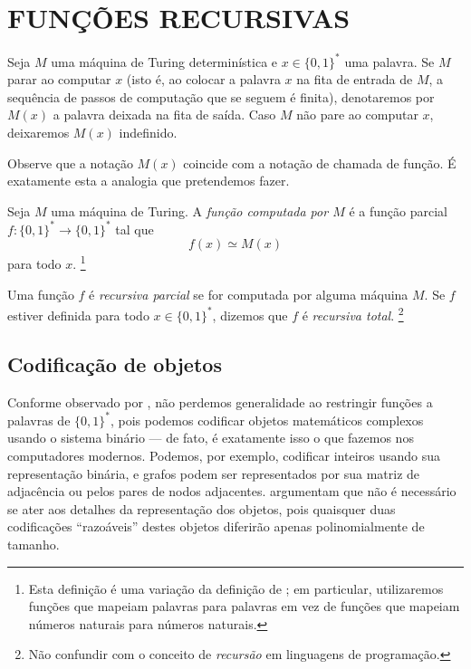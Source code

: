\section{FUNÇÕES RECURSIVAS}
\label{sec:recursive_functions}

\begin{notation}
    Seja $M$ uma máquina de Turing determinística
    e $x \in \{0, 1\}^*$ uma palavra.
    Se $M$ parar ao computar $x$
    (isto é,
    ao colocar a palavra $x$ na fita de entrada de $M$,
    a sequência de passos de computação que se seguem é finita),
    denotaremos por $M(x)$ a palavra deixada na fita de saída.
    Caso $M$ não pare ao computar $x$,
    deixaremos $M(x)$ indefinido.
\end{notation}

Observe que a notação $M(x)$ coincide com a notação de chamada de função.
É exatamente esta a analogia que pretendemos fazer.

\begin{definition}
    \label{def:recursive_function}
    Seja $M$ uma máquina de Turing.
    A \emph{função computada por $M$}
    é a função parcial $f: \{0, 1\}^* \to \{0, 1\}^*$ tal que
    \begin{equation*}
        f(x) \simeq M(x)
    \end{equation*}
    para todo $x$.%
    \footnote{
        Esta definição é uma variação da definição de
        ;
        em particular, utilizaremos funções que mapeiam palavras para palavras
        em vez de funções que mapeiam números naturais para números naturais.
    }

    Uma função $f$ é \emph{recursiva parcial}
    se for computada por alguma máquina $M$.
    Se $f$ estiver definida para todo $x \in \{0, 1\}^*$,
    dizemos que $f$ é \emph{recursiva total}.
    \footnote{
        Não confundir com o conceito de \emph{recursão} em linguagens de programação.
    }
\end{definition}

\subsection{Codificação de objetos}
\label{sec:binary_encoding}

Conforme observado por ,
não perdemos generalidade ao restringir funções a palavras de $\{0, 1\}^*$,
pois podemos codificar objetos matemáticos complexos usando o sistema binário
--- de fato,
é exatamente isso o que fazemos nos computadores modernos.
Podemos, por exemplo,
codificar inteiros usando sua representação binária,
e grafos podem ser representados por sua matriz de adjacência
ou pelos pares de nodos adjacentes.
 argumentam que
não é necessário se ater aos detalhes da representação dos objetos,
pois quaisquer duas codificações ``razoáveis'' destes objetos
diferirão apenas polinomialmente de tamanho.

